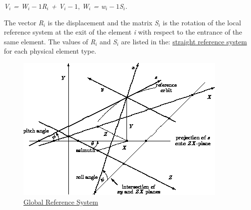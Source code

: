 \textit{V$_i$ = W$_i-1$R$_i$ + V$_i-1$}, \textit{W$_i$ = w$_i-1$S$_i$}. 

The vector \textit{R$_i$} is the displacement and the matrix
\textit{S$_i$} is the rotation of the local reference system  at the
exit of the element \textit{i} with respect to the entrance  of the same
element. The values of \textit{R$_i$} and \textit{S$_i$} are listed in
the:   \href{local_system.html#straight}{straight reference system} for
each physical element type.  
%
\begin{figure}[h!]
  \centering
	\includegraphics{figures/global.png}
  \caption{\href{global}{Global Reference System }}%
\end{figure}


